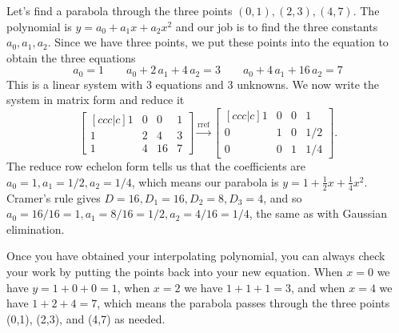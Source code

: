 \begin{example}
Let's find a parabola through the three points $(0, 1), (2, 3), (4, 7)$.  The polynomial is $y=a_0 +a_1 x+a_2 x^2$ and our job is to find the three constants $a_0, a_1, a_2$.  Since we have three points, we put these points into the equation to obtain the three equations
$$
a_{{0}}=1 \quad \quad 
a_{{0}}+2\,a_{{1}}+4\,a_{{2}}=3 \quad \quad 
a_{{0}}+4\,a_{{1}}+16\,a_{{2}}=7
$$
This is a linear system with 3 equations and 3 unknowns.  We now write the system in matrix form and reduce it
$$
\begin{bmatrix}[ccc|c] 
1&0&0&1\\
1&2&4&3\\
1&4&16&7
\end {bmatrix}
\xrightarrow{\text{rref}}
\begin{bmatrix}[ccc|c]
1&0&0&1\\
0&1&0&1/2\\
0&0&1&1/4
\end {bmatrix} 
.$$
The reduce row echelon form tells us that the coefficients are $a_0 = 1, a_1= 1/2, a_2=1/4$, which means our parabola is $y=1+\frac12 x+ \frac 14 x^2$. Cramer's rule gives $D=16, D_1=16, D_2=8, D_3=4$, and so $a_0 = 16/16=1, a_1=8/16=1/2, a_2=4/16=1/4$, the same as with Gaussian elimination. 

Once you have obtained your interpolating polynomial, you can always check your work by putting the points back into your new equation. When $x=0$ we have $y=1+0+0=1$, when $x=2$ we have $1+1+1=3$, and when $x=4$ we have $1+2+4=7$, which means the parabola passes through the three points (0,1), (2,3), and (4,7) as needed.  
\end{example}

